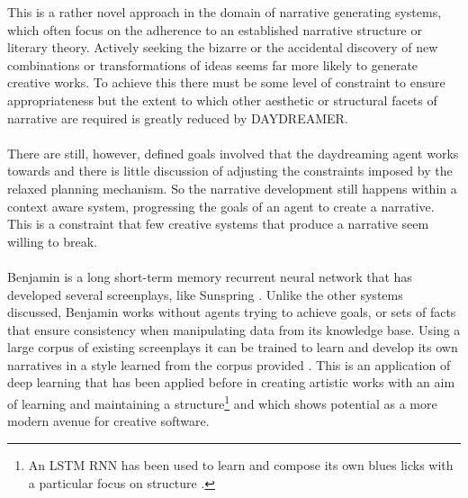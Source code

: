 \documentclass[letterpaper]{article}
\begin{document}
This is a rather novel approach in the domain of narrative generating systems, which often focus on the adherence to an established narrative structure or literary theory. Actively seeking the bizarre or the accidental discovery of new combinations or transformations of ideas seems far more likely to generate creative works. To achieve this there must be some level of constraint to ensure appropriateness but the extent to which other aesthetic or structural facets of narrative are required is greatly reduced by DAYDREAMER.\\
\\There are still, however, defined goals involved that the daydreaming agent works towards and there is little discussion of adjusting the constraints imposed by the relaxed planning mechanism. So the narrative development still happens within a context aware system, progressing the goals of an agent to create a narrative. This is a constraint that few creative systems that produce a narrative seem willing to break.\\
\\Benjamin is a long short-term memory recurrent neural network that has developed several screenplays, like Sunspring . Unlike the other systems discussed, Benjamin works without agents trying to achieve goals, or sets of facts that ensure consistency when manipulating data from its knowledge base. Using a large corpus of existing screenplays it can be trained to learn and develop its own narratives in a style learned from the corpus provided . This is an application of deep learning that has been applied before in creating artistic works with an aim of learning and maintaining a structure\footnote{An LSTM RNN has been used to learn and compose its own blues licks with a particular focus on structure .} and which shows potential as a more modern avenue for creative software.\\
\end{document}
